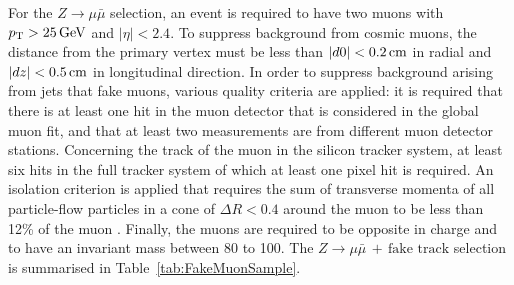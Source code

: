 For the $Z\rightarrow\mu\bar{\mu}$ selection, an event is required to have two muons with $p_{\text{T}}>25\,\text{Ge}\kern-0.06667em\text{V}$ and $|\eta|<2.4$.
To suppress background from cosmic muons, the distance from the primary vertex must be less than $|d0|<0.2\,\text{cm}$ in radial and $|dz|<0.5\,\text{cm}$ in longitudinal direction.
In order to suppress background arising from jets that fake muons, various quality criteria are applied: it is required that there is at least one hit in the muon detector that is considered in the global muon fit, 
and that at least two measurements are from different muon detector stations.
Concerning the track of the muon in the silicon tracker system, at least six hits in the full tracker system of which at least one pixel hit is required. %
An isolation criterion is applied that requires the sum of transverse momenta of all particle-flow particles in a cone of $\Delta R<0.4$ around the muon to be less than 12\% of the muon \pt.
Finally, the muons are required to be opposite in charge and to have an invariant mass between 80 to 100\gev.
The $Z\rightarrow\mu\bar{\mu}\,+\,\text{fake track}$ selection is summarised in Table~\ref{tab:FakeMuonSample}.
\renewcommand{\arraystretch}{1.4}
